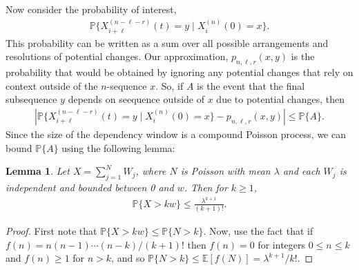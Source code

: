 \documentclass{article}
\newcommand{\E}{\mathbb{E}}
\renewcommand{\P}{\mathbb{P}}
\theoremstyle{plain}
\newtheorem{lemma}{Lemma}
\theoremstyle{definition}
\begin{document}
Now consider the probability of interest,
\begin{align*}
    \P\{ X_{i+\ell}^{(n-\ell-r)}(t) = y \mid X_i^{(n)}(0) = x \} .
\end{align*}
This probability can be written as a sum over all possible arrangements
and resolutions of potential changes.
Our approximation, $p_{n,\ell,r}(x,y)$ is the probability that would be obtained
by ignoring any potential changes that rely on context outside of the $n$-sequence $x$.
So, if $A$ is the event that the final subsequence $y$
depends on seequence outside of $x$ due to potential changes,
then
\begin{align*}
    \left|
        \P\{ X_{i+\ell}^{(n-\ell-r)}(t) = y \mid X_i^{(n)}(0) = x \}
        -
        p_{n,\ell,r}(x,y)
    \right|
    \le \P\{A\} .
\end{align*}
Since the size of the dependency window is a compound Poisson process,
we can bound $\P\{A\}$ using the following lemma:

\begin{lemma}
    Let $X = \sum_{j=1}^N W_j$,
    where $N$ is Poisson with mean $\lambda$
    and each $W_j$ is independent and bounded between 0 and $w$.
    Then for $k \ge 1$,
    \begin{align}
        \P\{ X > k w \}
        \le
        \frac{\lambda^{k+1}}{(k+1)!} .
    \end{align}
\end{lemma}

%

\begin{proof}
    First note that $\P\{X > kw\} \le \P\{N > k\}$.
    Now, use the fact that if $f(n) = n (n-1) \cdots (n-k) / (k+1)!$
    then $f(n) = 0$ for integers $0 \le n \le k$ and $f(n) \ge 1$ for $n > k$,
    and so $\P\{N > k\} \le \E[f(N)] = \lambda^{k+1} / k!$.
\end{proof}
\end{document}
